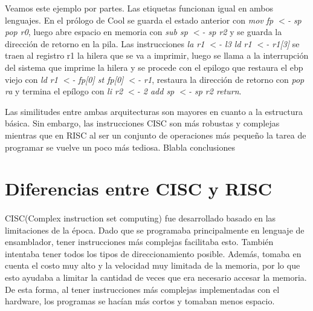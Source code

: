 \documentclass[10pt,a4paper]{article}
\begin{document}
Veamos este ejemplo por partes. Las etiquetas funcionan igual en ambos lenguajes. En el prólogo de Cool se guarda el estado anterior con \textit{mov fp $<$- sp pop r0}, luego abre espacio en memoria con \textit{sub sp $<$- sp r2} y se guarda la dirección de retorno en la pila. Las instrucciones \textit{la r1 $<$- l3 ld r1 $<$- r1[3]} se traen al registro r1 la hilera que se va a imprimir, luego se llama a la interrupción del sistema que imprime la hilera y se procede con el epilogo que restaura el ebp viejo con \textit{ld r1 $<$- fp[0] st fp[0] $<$- r1}, restaura la dirección de retorno con \textit{pop ra} y termina el epílogo con \textit{li r2 $<$- 2 add sp $<$- sp r2 return}.

Las similitudes entre ambas arquitecturas son mayores en cuanto a la estructura básica. Sin embargo, las instrucciones CISC son más robustas y complejas mientras que en RISC al ser un conjunto de operaciones más pequeño la tarea de programar se vuelve un poco más tediosa. Blabla conclusiones

\section*{Diferencias entre CISC y RISC}
\paragraph{}
CISC(Complex instruction set computing) fue desarrollado basado en las limitaciones de la época. Dado que se programaba principalmente en lenguaje de ensamblador, tener instrucciones más complejas facilitaba esto. También intentaba tener todos los tipos de direccionamiento posible. Además, tomaba en cuenta el costo muy alto y la velocidad muy limitada de la memoria, por lo que esto ayudaba a limitar la cantidad de veces que era necesario accesar la memoria. De esta forma, al tener instrucciones más complejas implementadas con el hardware, los programas se hacían más cortos y tomaban menos espacio.
\end{document}
